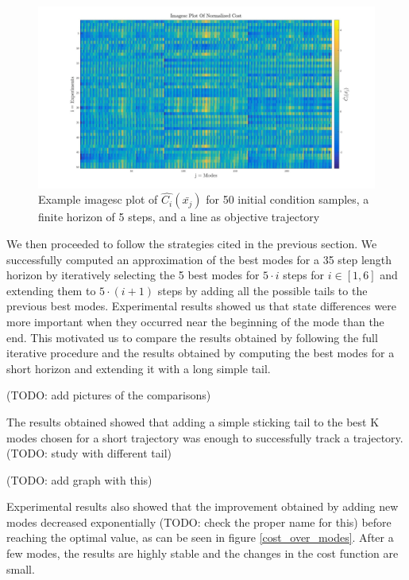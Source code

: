\documentclass[12,twoside]{TFG-GM}
\theoremstyle{definition}
\theoremstyle{remark}
\newcommand*\diff[1]{\bar{#1}}
\begin{document}
\begin{figure}[htb!]
\begin{center}
\includegraphics[width=16cm]{imagesc_after_std.jpg}
\caption{\label{imagesc_post} \small Example imagesc plot of $\hat{C_i}(\diff{x_j})$ for 50 initial condition samples, a finite horizon of 5 steps, and a line as objective trajectory}
\end{center}
\end{figure}

We then proceeded to follow the strategies cited in the previous section. We successfully computed an approximation of the best modes for a 35 step length horizon by iteratively selecting the 5 best modes for $5 \cdot i$ steps for $i \in [1, 6]$ and extending them to $5 \cdot (i + 1)$ steps by adding all the possible tails to the previous best modes. Experimental results showed us that state differences were more important when they occurred near the beginning of the mode than the end. This motivated us to compare the results obtained by following the full iterative procedure and the results obtained by computing the best modes for a short horizon and extending it with a long simple tail.

(TODO: add pictures of the comparisons)

The results obtained showed that adding a simple sticking tail to the best K modes chosen for a short trajectory was enough to successfully track a trajectory. (TODO: study with different tail)

(TODO: add graph with this)

Experimental results also showed that the improvement obtained by adding new modes decreased exponentially (TODO: check the proper name for this) before reaching the optimal value, as can be seen in figure \ref{cost_over_modes}. After a few modes, the results are highly stable and the changes in the cost function are small.
\end{document}
